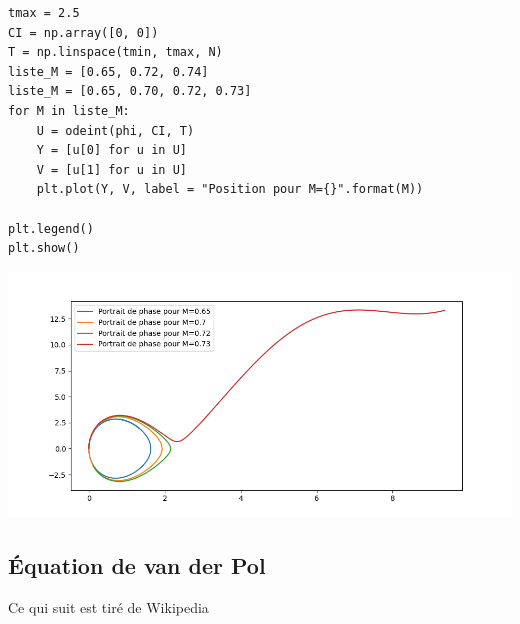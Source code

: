 \begin{Answer}
\begin{lstlisting}
tmax = 2.5
CI = np.array([0, 0])
T = np.linspace(tmin, tmax, N)
liste_M = [0.65, 0.72, 0.74]
liste_M = [0.65, 0.70, 0.72, 0.73]
for M in liste_M:
    U = odeint(phi, CI, T)
    Y = [u[0] for u in U]
    V = [u[1] for u in U]
    plt.plot(Y, V, label = "Position pour M={}".format(M))

plt.legend()
plt.show()
\end{lstlisting}
\begin{center}
\includegraphics[width=16cm]{TP/Images/ED2_asym2.png}
\end{center}
\end{Answer}
\newpage
\subsection{Équation de van der Pol}
Ce qui suit est tiré de Wikipedia

